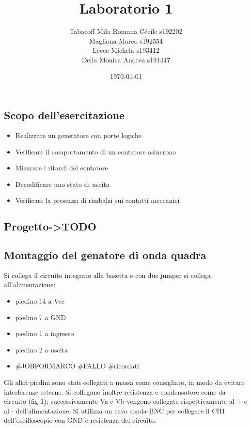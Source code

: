 \documentclass[a4paper]{article}
\begin{document}
\title{Laboratorio 1}
\author{
        Tabacoff Mila Romana Cécile s192202\\
        Magliona Marco s192554 \\
        Lecce Michela s193412\\
        Della Monica Andrea s191447}

\date{\today}
\maketitle

\newpage

\begin{tcolorbox}[breakable,colback=cyan,colframe=cyan]
\section*{Scopo dell'esercitazione}
\end{tcolorbox}

\begin{itemize}
\item Realizzare un generatore con porte logiche
\item Verificare il comportamento di un contatore asincrono
\item Misurare i ritardi del contatore
\item Decodificare uno stato di uscita
\item Verificare la presenza di rimbalzi sui contatti meccanici
\end{itemize}

\begin{tcolorbox}[breakable,colback=cyan,colframe=cyan]
\section*{Progetto->TODO}
\end{tcolorbox}


\begin{tcolorbox}[breakable,colback=cyan,colframe=cyan]
\section*{Montaggio del genatore di onda quadra}
\end{tcolorbox}

Si collega il circuito integrato alla basetta e con due jumper si collega all'alimentazione:
\begin{itemize}
\item piedino 14 a Vcc
\item piedino 7 a GND
\item piedino 1 a ingresso
\item piedino 2 a uscita
\item #JOBFORMARCO #FALLO #ricordati
\end{itemize}
Gli altri piedini sono stati collegati a massa come consigliato, in modo da evitare interferenze esterne.
Si collegano inoltre resistenza e condensatore come da circuito (fig 1); successivamente Va e Vb vengono collegate rispettivamente al + e al - dell'alimentazione.
Si utilizza un cavo sonda-BNC per collegare il CH1 dell'oscilloscopio con GND e resistenza del circuito.
\end{document}
